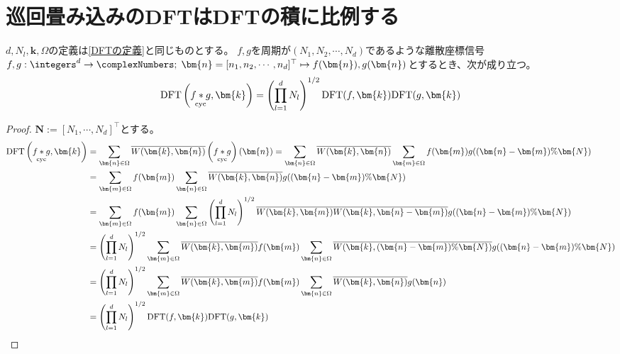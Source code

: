 			\section{巡回畳み込みのDFTはDFTの積に比例する}
				\begin{shadebox}
					$d,N_l,\bm{k},\Omega$の定義は\ref{DFTの定義}と同じものとする。
					$f,g$を周期が$(N_1,N_2,\cdots,N_d)$であるような離散座標信号$f,g: \integers^d\to\complexNumbers;\;\bm{n} = [n_1,n_2,\cdots,n_d]^\top \mapsto f(\bm{n}),g(\bm{n})$とするとき、次が成り立つ。
					\[ \text{DFT}\left(\cycConv{f}{g},\bm{k}\right) = \left(\prod_{l=1}^d N_l\right)^{1/2}\text{DFT}(f,\bm{k})\text{DFT}(g,\bm{k}) \]
				\end{shadebox}
				\begin{proof}
					\quad\par
					$\bm{N} := [N_1,\cdots,N_d]^\top$とする。
					\begin{align*}
						\text{DFT}\left(\cycConv{f}{g},\bm{k}\right) &= \sum_{\bm{n}\in\Omega}\overline{W(\bm{k},\bm{n})} \left(\cycConv{f}{g}\right)(\bm{n}) = \sum_{\bm{n}\in\Omega}\overline{W(\bm{k},\bm{n})} \sum_{\bm{m}\in\Omega} f(\bm{m})g((\bm{n}-\bm{m})\%\bm{N}) \\
						&= \sum_{\bm{m}\in\Omega} f(\bm{m}) \sum_{\bm{n}\in\Omega} \overline{W(\bm{k},\bm{n})}g((\bm{n}-\bm{m})\%\bm{N}) \\
						&= \sum_{\bm{m}\in\Omega} f(\bm{m}) \sum_{\bm{n}\in\Omega} \left(\prod_{l=1}^d N_l\right)^{1/2} \overline{W(\bm{k},\bm{m})} \overline{W(\bm{k},\bm{n}-\bm{m})} g((\bm{n}-\bm{m})\%\bm{N}) \\
						&= \left(\prod_{l=1}^d N_l\right)^{1/2} \sum_{\bm{m}\in\Omega} \overline{W(\bm{k},\bm{m})}f(\bm{m}) \sum_{\bm{n}\in\Omega} \overline{W(\bm{k},(\bm{n}-\bm{m})\%\bm{N})} g((\bm{n}-\bm{m})\%\bm{N}) \\
						&= \left(\prod_{l=1}^d N_l\right)^{1/2} \sum_{\bm{m}\in\Omega} \overline{W(\bm{k},\bm{m})}f(\bm{m}) \sum_{\bm{n}\in\Omega} \overline{W(\bm{k},\bm{n})} g(\bm{n}) \\
						&= \left(\prod_{l=1}^d N_l\right)^{1/2}\text{DFT}(f,\bm{k})\text{DFT}(g,\bm{k})
					\end{align*}
				\end{proof}

